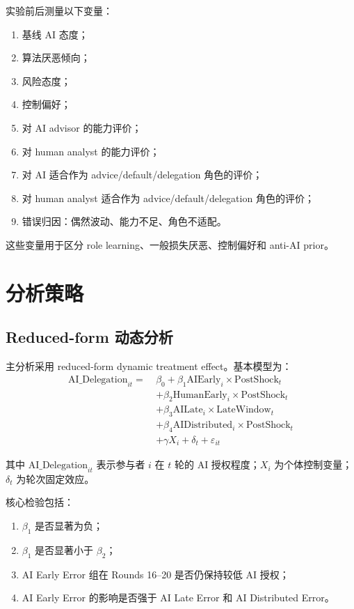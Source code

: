 \documentclass[12pt]{article}
\begin{document}
实验前后测量以下变量：
\begin{enumerate}[label=\arabic*.]
    \item 基线 AI 态度；
    \item 算法厌恶倾向；
    \item 风险态度；
    \item 控制偏好；
    \item 对 AI advisor 的能力评价；
    \item 对 human analyst 的能力评价；
    \item 对 AI 适合作为 advice/default/delegation 角色的评价；
    \item 对 human analyst 适合作为 advice/default/delegation 角色的评价；
    \item 错误归因：偶然波动、能力不足、角色不适配。
\end{enumerate}

这些变量用于区分 role learning、一般损失厌恶、控制偏好和 anti-AI prior。

\section{分析策略}

\subsection{Reduced-form 动态分析}

主分析采用 reduced-form dynamic treatment effect。基本模型为：
\begin{align*}
\text{AI\_Delegation}_{it} =\ & \beta_0 + \beta_1 \text{AIEarly}_i \times \text{PostShock}_t \\
& + \beta_2 \text{HumanEarly}_i \times \text{PostShock}_t \\
& + \beta_3 \text{AILate}_i \times \text{LateWindow}_t \\
& + \beta_4 \text{AIDistributed}_i \times \text{PostShock}_t \\
& + \gamma X_i + \delta_t + \varepsilon_{it}
\end{align*}

其中 $\text{AI\_Delegation}_{it}$ 表示参与者 $i$ 在 $t$ 轮的 AI 授权程度；$X_i$ 为个体控制变量；$\delta_t$ 为轮次固定效应。

核心检验包括：
\begin{enumerate}[label=\arabic*.]
    \item $\beta_1$ 是否显著为负；
    \item $\beta_1$ 是否显著小于 $\beta_2$；
    \item AI Early Error 组在 Rounds 16--20 是否仍保持较低 AI 授权；
    \item AI Early Error 的影响是否强于 AI Late Error 和 AI Distributed Error。
\end{enumerate}
\end{document}
